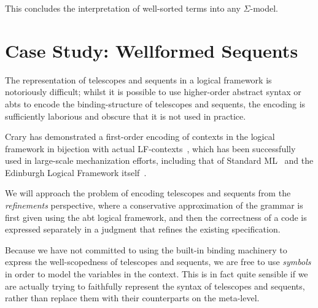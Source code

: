 \documentclass[11pt]{article}
\theoremstyle{definition}
\theoremstyle{remark}
\numberwithin{equation}{section}
\begin{document}
This concludes the interpretation of well-sorted terms into any $\Sigma$-model.

\section{Case Study: Wellformed Sequents}

The representation of telescopes and sequents in a logical framework is
notoriously difficult; whilst it is possible to use higher-order abstract
syntax or abts to encode the binding-structure of telescopes
and sequents, the encoding is sufficiently laborious and obscure that it is not
used in practice.

Crary has demonstrated a first-order encoding of contexts in the logical
framework in bijection with actual LF-contexts~\cite{crary:2009}, which has
been successfully used in large-scale mechanization efforts, including that of
Standard ML~\cite{lee-crary-harper:2007} and the Edinburgh Logical Framework
itself~\cite{martens-crary:2012}.


We will approach the problem of encoding telescopes and sequents from the
\emph{refinements} perspective, where a conservative approximation of the
grammar is first given using the abt logical framework, and then the
correctness of a code is expressed separately in a judgment that refines the
existing specification.

Because we have not committed to using the built-in binding machinery to
express the well-scopedness of telescopes and sequents, we are free to use
\emph{symbols} in order to model the variables in the context. This is in fact
quite sensible if we are actually trying to faithfully represent the syntax of
telescopes and sequents, rather than replace them with their counterparts on
the meta-level.
\end{document}

